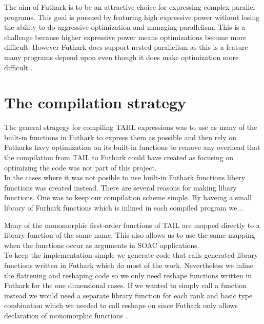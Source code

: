 \documentclass[11pt]{article}
\begin{document}
The aim of Futhark is to be an attractive choice for expressing complex parallel programs.
This goal is pursued by featuring high expressive power without
losing the ability to do aggressive optimization and managing parallelism.
This is a challenge because higher expressive power means optimizations become more difficult. 
However Futhark does support nested parallelism as this is a feature many programs 
depend upon even though it does make optimization more difficult \cite{TroelsHenriksen}.




\section{The compilation strategy}
The general stragegy for compiling TAIIL expressions was to use as many of the built-in functions in Futhark to express them as possible and then rely on Futharks havy optimization on its built-in functions to remove any overhead that the compilation from TAIL to Futhark could have created as focusing on optimizing the code was not part of this project. \\

In the cases where it was not posible to use built-in Futhark functions libery functions was created instead. 
There are several reasons for making libary functions. One was to keep our compilation scheme simple. By haveing a  small library of Furhark functions which is inlined in each compiled program we... %

Many of the monomorphic first-order functions of TAIL are mapped directly to a library function of the same name. This also allows us to use the same mapping when the functions occur as arguments in SOAC applications.\\

To keep the implementation simple we generate code that calls generated library functions written in Futhark which do most of the work.
Nevertheless we inline the flattening and reshaping code so we only need reshape functions written in Futhark
for the one dimensional cases. If we wanted to simply call a function instead we would need a separate library function for each
rank and basic type combination which we needed to call reshape on since Futhark only allows declaration of monomorphic functions \cite{TroelsHenriksen}.
\end{document}
